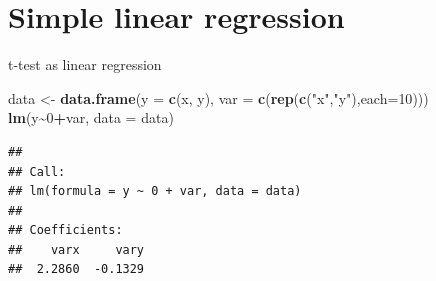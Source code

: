 \documentclass[
  ignorenonframetext,
]{beamer}
\newenvironment{Shaded}{\begin{snugshade}}{\end{snugshade}}
\newcommand{\AttributeTok}[1]{\textcolor[rgb]{0.13,0.29,0.53}{#1}}
\newcommand{\DecValTok}[1]{\textcolor[rgb]{0.00,0.00,0.81}{#1}}
\newcommand{\FunctionTok}[1]{\textcolor[rgb]{0.13,0.29,0.53}{\textbf{#1}}}
\newcommand{\NormalTok}[1]{#1}
\newcommand{\OtherTok}[1]{\textcolor[rgb]{0.56,0.35,0.01}{#1}}
\newcommand{\SpecialCharTok}[1]{\textcolor[rgb]{0.81,0.36,0.00}{\textbf{#1}}}
\newcommand{\StringTok}[1]{\textcolor[rgb]{0.31,0.60,0.02}{#1}}
\begin{document}
\hypertarget{simple-linear-regression}{%
\section{Simple linear regression}\label{simple-linear-regression}}

\begin{frame}[fragile]{t-test as linear regression}
\protect\hypertarget{t-test-as-linear-regression}{}
\begin{codebox}

\begin{Shaded}
\begin{Highlighting}[]
\NormalTok{data }\OtherTok{\textless{}{-}} \FunctionTok{data.frame}\NormalTok{(}\AttributeTok{y =} \FunctionTok{c}\NormalTok{(x, y), }
                   \AttributeTok{var =} \FunctionTok{c}\NormalTok{(}\FunctionTok{rep}\NormalTok{(}\FunctionTok{c}\NormalTok{(}\StringTok{"x"}\NormalTok{,}\StringTok{"y"}\NormalTok{),}\AttributeTok{each=}\DecValTok{10}\NormalTok{)))}
\FunctionTok{lm}\NormalTok{(y}\SpecialCharTok{\textasciitilde{}}\DecValTok{0}\SpecialCharTok{+}\NormalTok{var, }\AttributeTok{data =}\NormalTok{ data)}
\end{Highlighting}
\end{Shaded}

\end{codebox}

\begin{codebox}

\begin{verbatim}
## 
## Call:
## lm(formula = y ~ 0 + var, data = data)
## 
## Coefficients:
##    varx     vary  
##  2.2860  -0.1329
\end{verbatim}

\end{codebox}
\end{frame}
\end{document}
